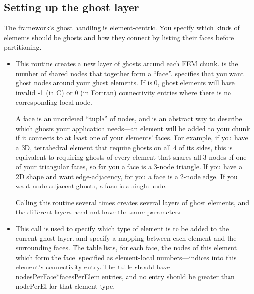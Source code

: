 \subsection{Setting up the ghost layer}
The framework's ghost handling is element-centric. You specify which kinds of elements should be ghosts and how they connect by listing their faces before partitioning.  

\begin{itemize}
\item

This routine creates a new layer of ghosts around each FEM chunk.  is the number of shared nodes that together form a ``face''.  specifies that you want ghost nodes around your ghost elements.  If  is 0, ghost elements will have invalid -1 (in C) or 0 (in Fortran) connectivity entries where there is no corresponding local node.

A face is an unordered ``tuple'' of nodes, and is an abstract way to describe which ghosts
your application needs---an element will be added to your chunk if it connects to at 
least one of your elements' faces.  For example, if you have a 3D, tetrahedral element that require ghosts 
on all 4 of its sides, this is equivalent to requiring ghosts of every element that shares all 3
nodes of one of your triangular faces, so for you a face is a 3-node triangle.  If you have a 2D shape
and want edge-adjacency, for you a face is a 2-node edge.  If you want node-adjacent ghosts,
a face is a single node.

Calling this routine several times creates several layers of ghost elements, and the different layers need not have the same parameters.

\item
{}

This call is used to specify which type of element is to be added to the current ghost layer.  and  specify a mapping between each element and the surrounding faces.  The  table lists, for each face, the nodes of this element which form the face, specified as element-local numbers---indices into this element's connectivity entry. The  table should have nodesPerFace*facesPerElem entries, and no entry should be greater than nodePerEl for that element type.


\end{itemize}
